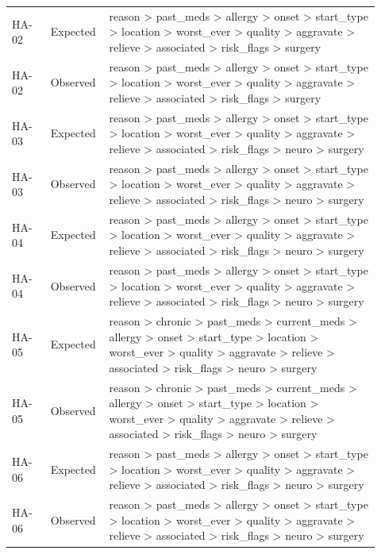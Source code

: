 \begin{longtable}{>{\raggedright\arraybackslash}p{0.1\linewidth}>{\raggedright\arraybackslash}p{0.12\linewidth}>{\raggedright\arraybackslash}p{0.7\linewidth}}
HA-\allowbreak{}02 & Expected & reason > past\_\allowbreak{}meds > allergy > onset > start\_\allowbreak{}type > location > worst\_\allowbreak{}ever > quality > aggravate > relieve > associated > risk\_\allowbreak{}flags > surgery \\
HA-\allowbreak{}02 & Observed & reason > past\_\allowbreak{}meds > allergy > onset > start\_\allowbreak{}type > location > worst\_\allowbreak{}ever > quality > aggravate > relieve > associated > risk\_\allowbreak{}flags > surgery \\
HA-\allowbreak{}03 & Expected & reason > past\_\allowbreak{}meds > allergy > onset > start\_\allowbreak{}type > location > worst\_\allowbreak{}ever > quality > aggravate > relieve > associated > risk\_\allowbreak{}flags > neuro > surgery \\
HA-\allowbreak{}03 & Observed & reason > past\_\allowbreak{}meds > allergy > onset > start\_\allowbreak{}type > location > worst\_\allowbreak{}ever > quality > aggravate > relieve > associated > risk\_\allowbreak{}flags > neuro > surgery \\
HA-\allowbreak{}04 & Expected & reason > past\_\allowbreak{}meds > allergy > onset > start\_\allowbreak{}type > location > worst\_\allowbreak{}ever > quality > aggravate > relieve > associated > risk\_\allowbreak{}flags > neuro > surgery \\
HA-\allowbreak{}04 & Observed & reason > past\_\allowbreak{}meds > allergy > onset > start\_\allowbreak{}type > location > worst\_\allowbreak{}ever > quality > aggravate > relieve > associated > risk\_\allowbreak{}flags > neuro > surgery \\
HA-\allowbreak{}05 & Expected & reason > chronic > past\_\allowbreak{}meds > current\_\allowbreak{}meds > allergy > onset > start\_\allowbreak{}type > location > worst\_\allowbreak{}ever > quality > aggravate > relieve > associated > risk\_\allowbreak{}flags > neuro > surgery \\
HA-\allowbreak{}05 & Observed & reason > chronic > past\_\allowbreak{}meds > current\_\allowbreak{}meds > allergy > onset > start\_\allowbreak{}type > location > worst\_\allowbreak{}ever > quality > aggravate > relieve > associated > risk\_\allowbreak{}flags > neuro > surgery \\
HA-\allowbreak{}06 & Expected & reason > past\_\allowbreak{}meds > allergy > onset > start\_\allowbreak{}type > location > worst\_\allowbreak{}ever > quality > aggravate > relieve > associated > risk\_\allowbreak{}flags > neuro > surgery \\
HA-\allowbreak{}06 & Observed & reason > past\_\allowbreak{}meds > allergy > onset > start\_\allowbreak{}type > location > worst\_\allowbreak{}ever > quality > aggravate > relieve > associated > risk\_\allowbreak{}flags > neuro > surgery \\

\end{longtable}
